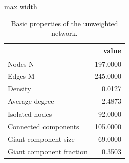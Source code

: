 \begin{table}
\centering
\caption{Basic properties of the unweighted network.}
\label{tab:graph_summary}
\begin{adjustbox}{max width=\textwidth}
\begin{tabular}{lr}
\toprule
 & value \\
\midrule
Nodes N & 197.0000 \\
Edges M & 245.0000 \\
Density & 0.0127 \\
Average degree & 2.4873 \\
Isolated nodes & 92.0000 \\
Connected components & 105.0000 \\
Giant component size & 69.0000 \\
Giant component fraction & 0.3503 \\
\bottomrule
\end{tabular}
\end{adjustbox}
\end{table}
